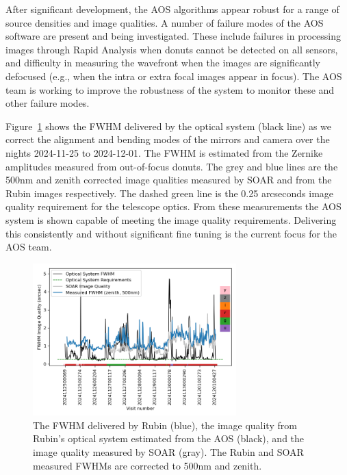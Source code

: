 After significant development, the AOS algorithms appear robust for a range of source densities and image qualities. A number of failure modes of the AOS software are present and being investigated. These include failures in processing images through Rapid Analysis when donuts cannot be detected on all sensors, and difficulty in measuring the wavefront when the images are significantly defocused (e.g., when the intra or extra focal images appear in focus). The AOS team is working to improve the robustness of the system to monitor these and other failure modes.

Figure~\ref{fig:aos} shows the FWHM delivered by the optical system (black line) as we correct the alignment and bending modes of the mirrors and camera over the nights 2024-11-25 to 2024-12-01. The FWHM is estimated from the Zernike amplitudes measured from out-of-focus donuts. The grey and blue lines are the 500nm and zenith corrected image qualities measured by SOAR and from the Rubin images respectively. The dashed green line is the 0.25 arcseconds image quality requirement for the telescope optics. From these measurements the AOS system is shown capable of meeting the image quality requirements. Delivering this consistently and without significant fine tuning is the current focus for the AOS team.

\begin{figure}
    \centering \includegraphics[width=0.7\textwidth]{figures/optical_performance.png}
    \caption{The FWHM delivered by Rubin (blue), the image quality from Rubin's optical system estimated from the AOS (black), and the image quality measured by SOAR (gray). The Rubin and SOAR measured FWHMs are corrected to 500nm and zenith.}
    \label{fig:aos}
\end{figure}


